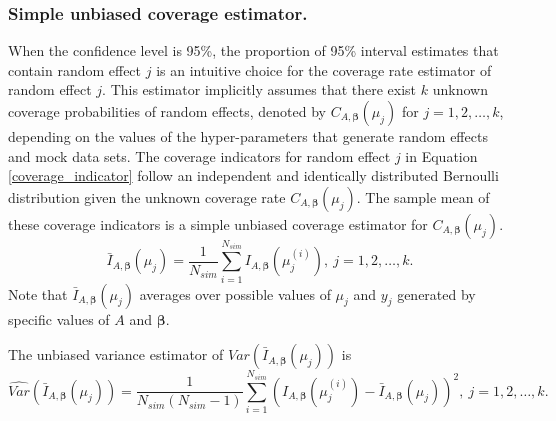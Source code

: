 \documentclass[article]{jss}
\begin{document}
\subsubsection{Simple unbiased coverage estimator.}
When the confidence level is 95\%, the proportion of 95\% interval estimates that contain random effect $j$ is an intuitive choice for  the coverage rate estimator of random effect $j$. This estimator  implicitly assumes that there exist $k$ unknown coverage probabilities of random effects, denoted by $C_{A, \boldsymbol{\beta}}(\mu_j)$ for $j=1, 2, \ldots, k$, depending on the values of the hyper-parameters that generate random effects and mock data sets. The coverage indicators for random effect $j$ in Equation \ref{coverage_indicator} follow an independent and identically distributed  Bernoulli distribution given the unknown coverage rate $C_{A, \boldsymbol{\beta}}(\mu_j)$. The sample mean of these coverage indicators is a simple unbiased coverage estimator for $C_{A, \boldsymbol{\beta}}(\mu_j)$.  %
\begin{equation}
\bar{I}_{A, \boldsymbol{\beta}}(\mu_j)= \frac{1}{N_{sim}}\sum_{i=1}^{N_{sim}}I_{A, \boldsymbol{\beta}}(\mu_j^{(i)}),~ j=1, 2, \ldots, k.
\end{equation}
Note that $\bar{I}_{A, \boldsymbol{\beta}}(\mu_j)$ averages over possible values of $\mu_{j}$ and $y_{j}$ generated by specific values of $A$ and $\boldsymbol{\beta}$. 


The unbiased variance estimator of $Var(\bar{I}_{A, \boldsymbol{\beta}}(\mu_j))$ is 
\begin{equation}\label{svar}
\widehat{Var}(\bar{I}_{A, \boldsymbol{\beta}}(\mu_j))=\frac{1}{N_{sim}(N_{sim}-1)}\sum_{i=1}^{N_{sim}}(I_{A, \boldsymbol{\beta}}(\mu_j^{(i)})-\bar{I}_{A, \boldsymbol{\beta}}(\mu_j))^{2},~ j=1, 2, \ldots, k.
\end{equation}
\end{document}
